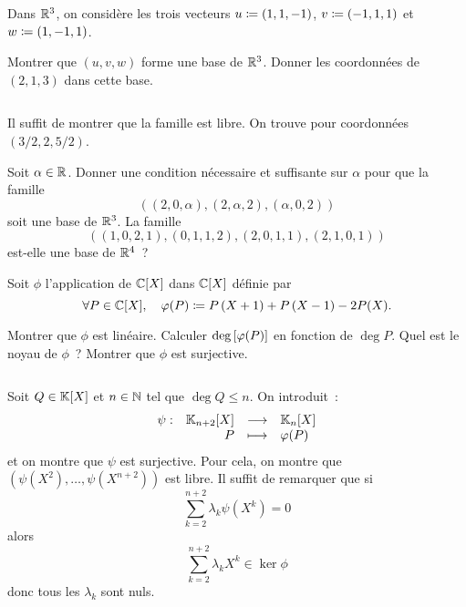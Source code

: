\documentclass{magnolia}
\begin{document}

Dans $\mathbb{R}^3$, on considère les trois vecteurs $u\coloneqq(1,1,-1)$, $v\coloneqq(-1,1,1)$ et
$w\coloneqq(1,-1,1)$.
\begin{questions}
\question Montrer que $(u,v,w)$ forme une base de $\mathbb{R}^3$.
\question Donner les coordonnées de $(2,1,3)$ dans cette base.
\end{questions}
\begin{sol}
$\quad$
\begin{questions}
\question Il suffit de montrer que la famille est libre.
\question On trouve pour coordonnées $(3/2,2,5/2)$.
\end{questions}
\end{sol}

\begin{questions}
\question Soit $\alpha\in\mathbb{R}$. Donner une condition nécessaire
  et suffisante sur $\alpha$ pour que la famille
  \[((2,0,\alpha),(2,\alpha,2),(\alpha,0,2))\]
  soit une base de $\mathbb{R}^3$.
\question La famille
  \[((1, 0, 2, 1), (0, 1, 1, 2), (2, 0, 1, 1), (2, 1, 0, 1))\]
  est-elle une base de $\mathbb{R}^4$~?
\end{questions}



Soit $\phi$ l'application de $\polyC$ dans $\polyC$ définie par
\[\forall P\in\polyC \qsep \phi(P)\defeq P\p{X+1}+P\p{X-1}-2P(X).\]
\begin{questions}
\question Montrer que $\phi$ est linéaire.
\question Calculer $\deg\left[\varphi(P)\right]$ en fonction de $\deg P$.
\question Quel est le noyau de $\phi$~?
\question Montrer que $\phi$ est surjective.
\end{questions}
\begin{sol}
$\quad$
\begin{questions}
\question
\question
\question Soit $Q\in\polyK$ et $n\in\mathbb{N}$ tel que $\deg Q\leq n$. On
  introduit~:
  \[\dspappli{\psi}{\polyK[n+2]}{\polyK[n]}{P}{\phi(P)}\]
  et on montre que $\psi$ est surjective. Pour cela, on montre que
  $(\psi(X^2),\ldots,\psi(X^{n+2}))$ est libre. Il suffit de remarquer
  que si
  \[\sum_{k=2}^{n+2} \lambda_k \psi(X^k)=0\]
  alors
  \[\sum_{k=2}^{n+2} \lambda_k X^k\in\ker\phi\]
  donc tous les $\lambda_k$ sont nuls.
\end{questions}
\end{sol}
\end{document}
